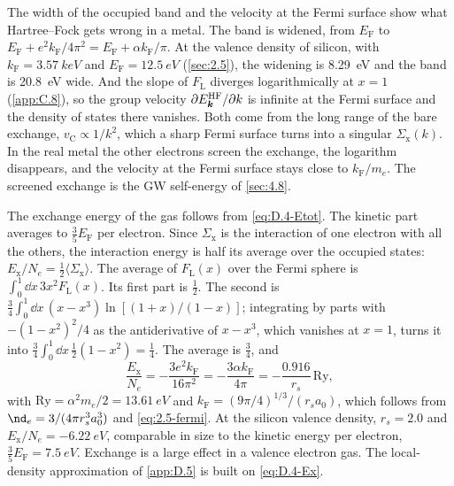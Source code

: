 The width of the occupied band and the velocity at the Fermi surface show what Hartree--Fock gets wrong in a metal. The band is widened, from $E_{\mathrm{F}}$ to $E_{\mathrm{F}} + e^2k_{\mathrm{F}}/4\pi^2 = E_{\mathrm{F}} + \alpha k_{\mathrm{F}}/\pi$. At the valence density of silicon, with $k_{\mathrm{F}} = \SI{3.57}{keV}$ and $E_{\mathrm{F}} = \SI{12.5}{eV}$ (\cref{sec:2.5}), the widening is \SI{8.29}{eV} and the band is \SI{20.8}{eV} wide. And the slope of $F_{\mathrm{L}}$ diverges logarithmically at $x = 1$ (\cref{app:C.8}), so the group velocity $\partial E^{\mathrm{HF}}_{\bm{k}}/\partial k$ is infinite at the Fermi surface and the density of states there vanishes. Both come from the long range of the bare exchange, $v_{\mathrm{C}} \propto 1/k^2$, which a sharp Fermi surface turns into a singular $\Sigma_{\mathrm{x}}(k)$. In the real metal the other electrons screen the exchange, the logarithm disappears, and the velocity at the Fermi surface stays close to $k_{\mathrm{F}}/m_e$. The screened exchange is the GW self-energy of \cref{sec:4.8}.

The exchange energy of the gas follows from \cref{eq:D.4-Etot}. The kinetic part averages to $\tfrac35E_{\mathrm{F}}$ per electron. Since $\Sigma_{\mathrm{x}}$ is the interaction of one electron with all the others, the interaction energy is half its average over the occupied states: $E_{\mathrm{x}}/N_e = \tfrac12\langle\Sigma_{\mathrm{x}}\rangle$. The average of $F_{\mathrm{L}}(x)$ over the Fermi sphere is $\int_0^1\dd x\,3x^2F_{\mathrm{L}}(x)$. Its first part is $\tfrac12$. The second is $\tfrac34\int_0^1\dd x\,(x - x^3)\ln[(1 + x)/(1 - x)]$; integrating by parts with $-(1 - x^2)^2/4$ as the antiderivative of $x - x^3$, which vanishes at $x = 1$, turns it into $\tfrac34\int_0^1\dd x\,\tfrac12(1 - x^2) = \tfrac14$. The average is $\tfrac34$, and
\begin{equation}
  \frac{E_{\mathrm{x}}}{N_e} = -\frac{3e^2k_{\mathrm{F}}}{16\pi^2} = -\frac{3\alpha k_{\mathrm{F}}}{4\pi} = -\frac{0.916}{r_s}\,\mathrm{Ry} ,
  \label{eq:D.4-Ex}
\end{equation}
with $\mathrm{Ry} = \alpha^2m_e/2 = \SI{13.61}{eV}$ and $k_{\mathrm{F}} = (9\pi/4)^{1/3}/(r_sa_0)$, which follows from $\nd_e = 3/(4\pi r_s^3a_0^3)$ and \cref{eq:2.5-fermi}. At the silicon valence density, $r_s = 2.0$ and $E_{\mathrm{x}}/N_e = \SI{-6.22}{eV}$, comparable in size to the kinetic energy per electron, $\tfrac35E_{\mathrm{F}} = \SI{7.5}{eV}$. Exchange is a large effect in a valence electron gas. The local-density approximation of \cref{app:D.5} is built on \cref{eq:D.4-Ex}.
